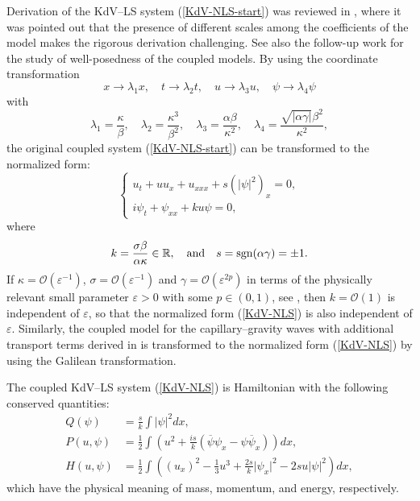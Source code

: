 \documentclass[12pt,reqno]{amsart}
\numberwithin{equation}{section}
\begin{document}
Derivation of the KdV--LS system (\ref{KdV-NLS-start}) was reviewed in \cite{Nguyen}, where it was pointed out that the presence of different scales among the coefficients of the model makes the rigorous derivation challenging. See also the follow-up work \cite{Nguyen2} for the study of well-posedness of the coupled models. By using the coordinate transformation 
$$
x\rightarrow \lambda_{1} x, \quad t \rightarrow \lambda_{2} t, \quad u\rightarrow \lambda_{3} u, \quad \psi\rightarrow \lambda_{4}\psi
$$
with 
$$
\lambda_1 = \frac{\kappa}{\beta}, \quad \lambda_2 = \frac{\kappa^3}{\beta^2}, \quad \lambda_3 = \frac{\alpha \beta}{\kappa^2}, \quad 
\lambda_4 = \frac{\sqrt{|\alpha \gamma |} \beta^2}{\kappa^2},
$$
the original coupled system (\ref{KdV-NLS-start}) can be transformed to the normalized form:
\begin{equation}
    \label{KdV-NLS}
\begin{cases}
    u_{t} + uu_{x} + u_{xxx} + s(\vert \psi\vert^2)_{x}=0, \\
 i\psi_{t}+\psi_{xx}+ku\psi=0,
\end{cases}
\end{equation}
where
\[
k = \frac{\sigma \beta}{\alpha \kappa} \in \mathbb{R}, \quad \mbox{\rm and} \quad  
s = \text{sgn}(\alpha \gamma) = \pm 1.
\]
If $\kappa = \mathcal{O}(\varepsilon^{-1})$, $\sigma = \mathcal{O}(\varepsilon^{-1})$ and $\gamma = \mathcal{O}(\varepsilon^{2p})$ in terms of the physically relevant small parameter $\varepsilon > 0$ with some $p \in (0,1)$, see \cite{Sul}, then $k = \mathcal{O}(1)$ is independent of $\varepsilon$, so that the normalized form (\ref{KdV-NLS}) is also independent of  $\varepsilon$. Similarly, the coupled model for the capillary--gravity waves with additional transport terms derived in \cite{kaw} is transformed to the 
normalized form (\ref{KdV-NLS}) by using the Galilean transformation. 

The coupled KdV--LS system (\ref{KdV-NLS}) is Hamiltonian with the following conserved quantities:
\begin{align}
\label{mass}
Q(\psi) &= \frac{s}{k} \int \vert \psi\vert^2dx, \\
\label{momentum}
P(u,\psi) &= \frac{1}{2} \int\left( u^2 + \frac{i s}{k} (\overline{\psi}\psi_x - \psi\overline{\psi}_x) \right)dx, \\ 
\label{energy}
H(u,\psi) &= \frac{1}{2} \int\left( (u_{x})^2 - \frac{1}{3} u^3 + \frac{2 s}{k}\vert \psi_{x}\vert^2 - 2 s u\vert \psi\vert^2\right)dx,
\end{align}
which have the physical meaning of mass, momentum, and energy, respectively.  
\end{document}
